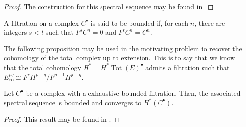 \begin{proof}
  The construction for this spectral sequence may be found in \cite[Chapter 5]{weibel1995introduction}
\end{proof}
\begin{definition}
  A filtration on a complex $C^\bullet$ is said to be bounded
 if, for each $n$, there are integers $s<t$ such that $F^s C^n = 0$ and $F^t C^n = C^n$.
\end{definition}
The following proposition may be used in the motivating problem to recover the cohomology of the total complex up to extension.
This is to say that we know that the total cohomology $H^* = H^* \operatorname{Tot}(E)^\bullet$ admits a filtration such that $E^{pq}_\infty \cong F^p H^{p+q}/ F^{p-1} H^{p+q}$.
 \begin{proposition}\label{prop: FiltrationSpectral}
   Let $C^\bullet$ be a complex with a exhaustive bounded filtration.
   Then, the associated spectral sequence is bounded and converges to $H^*(C^\bullet)$.
 \end{proposition}
 \begin{proof}
   This result may be found in \cite[Chapter 5]{weibel1995introduction}.
 \end{proof}
